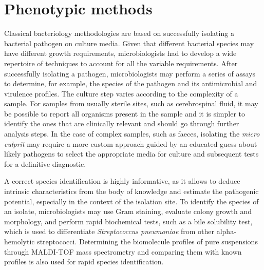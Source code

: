 \section{Phenotypic methods}

Classical bacteriology methodologies are based on successfully isolating a bacterial pathogen on culture media. Given that different bacterial species may have different growth requirements, microbiologists had to develop a wide repertoire of techniques to account for all the variable requirements. After successfully isolating a pathogen, microbiologists may perform a series of assays to determine, for example, the species of the pathogen and its antimicrobial and virulence profiles. The culture step varies according to the complexity of a sample. For samples from usually sterile sites, such as cerebrospinal fluid, it may be possible to report all organisms present in the sample and it is simpler to identify the ones that are clinically relevant and should go through further analysis steps. In the case of complex samples, such as faeces, isolating the \textit{micro culprit} may require a more custom approach guided by an educated guess about likely pathogens to select the appropriate media for culture and subsequent tests for a definitive diagnostic.

A correct species identification is highly informative, as it allows to deduce intrinsic characteristics from the body of knowledge and estimate the pathogenic potential, especially in the context of the isolation site. To identify the species of an isolate, microbiologists may use Gram staining, evaluate colony growth and morphology, and perform rapid biochemical tests, such as a bile solubility test, which is used to differentiate \textit{Streptococcus pneumoniae} from other alpha-hemolytic streptococci. Determining the biomolecule profiles of pure suspensions through \ac{MALDI-TOF} mass spectrometry and comparing them with known profiles is also used for rapid species identification.

